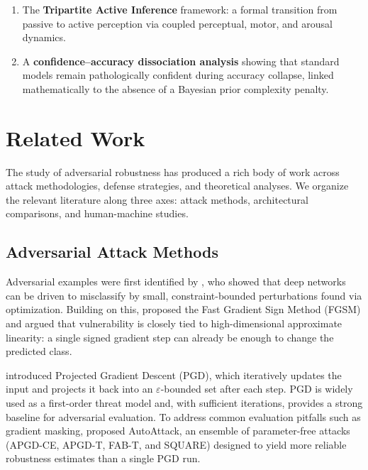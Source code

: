 \documentclass[12pt,a4paper]{article}
\begin{document}
\begin{enumerate}[leftmargin=1.5em]
        Epistemic Autopoiesis (adversarial noise annihilation via null-space
        projection), and GroupNorm as an orthogonal gradient projection operator.
  \item The \textbf{Tripartite Active Inference} framework: a formal
        transition from passive to active perception via coupled perceptual,
        motor, and arousal dynamics.
  \item A \textbf{confidence--accuracy dissociation analysis} showing that
        standard models remain pathologically confident during accuracy
        collapse, linked mathematically to the absence of a Bayesian prior
        complexity penalty.
\end{enumerate}

\section{Related Work}
\label{sec:related}

The study of adversarial robustness has produced a rich body of work
across attack methodologies, defense strategies, and theoretical
analyses. We organize the relevant literature along three axes:
attack methods, architectural comparisons, and human-machine studies.

\subsection{Adversarial Attack Methods}

Adversarial examples were first identified by \citet{szegedy2013intriguing},
who showed that deep networks can be driven to misclassify by small,
constraint-bounded perturbations found via optimization. Building on this,
\citet{goodfellow2015explaining} proposed the Fast Gradient Sign Method
(FGSM) and argued that vulnerability is closely tied to high-dimensional
approximate linearity: a single signed gradient step can already be enough
to change the predicted class.

\citet{madry2018towards} introduced Projected Gradient Descent (PGD), which
iteratively updates the input and projects it back into an
$\varepsilon$-bounded set after each step. PGD is widely used as a
first-order threat model and, with sufficient iterations, provides a strong
baseline for adversarial evaluation. To address common evaluation pitfalls
such as gradient masking, \citet{croce2020reliable} proposed AutoAttack, an
ensemble of parameter-free attacks (APGD-CE, APGD-T, FAB-T, and SQUARE)
designed to yield more reliable robustness estimates than a single PGD run.
\end{document}
